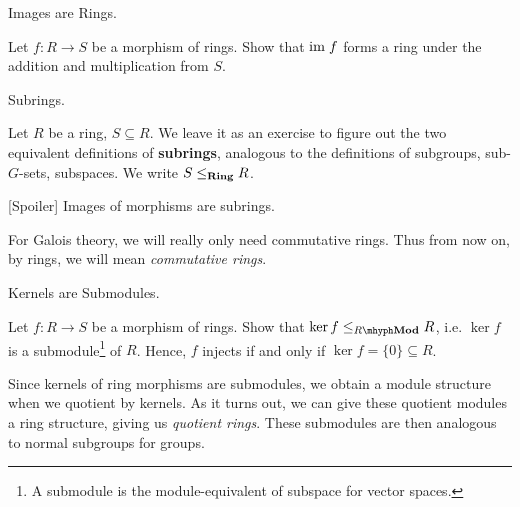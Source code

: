 \documentclass[../../book.tex]{subfiles}
\begin{document}
\begin{ex} [Important] Images are Rings. 

    Let $f : R \to S$ be a morphism of rings. 
    Show that $\textnormal{im}\; f$ forms a ring under the addition and multiplication from $S$. 
\end{ex}

\begin{dfn} Subrings. 

    Let $R$ be a ring, $S \subseteq R$. 
    We leave it as an exercise to figure out the two equivalent definitions
    of \textbf{subrings}, analogous to 
    the definitions of subgroups, sub-$G$-sets, subspaces. 
    We write $S \leq_{\mathbf{Ring}} R$.
    
    [Spoiler] Images of morphisms are subrings. 
\end{dfn}

\begin{rmk}
    For Galois theory, we will really only need commutative rings. 
    Thus from now on, by rings, we will mean \emph{commutative rings}. 
\end{rmk}

\begin{ex} [Important] Kernels are Submodules.

    Let $f : R \to S$ be a morphism of rings. 
    Show that $\ker f \leq_{\RMod} R$, i.e. 
    $\ker f$ is a submodule\footnote{
    A submodule is the module-equivalent of subspace for vector spaces.} of $R$.
    Hence, $f$ injects if and only if $\ker f = \{0\} \subseteq R$.  
\end{ex}

\begin{rmk} 
    
    Since kernels of ring morphisms are submodules, 
    we obtain a module structure when we quotient by kernels.
    As it turns out, we can give these quotient modules a ring structure,
    giving us \emph{quotient rings}.
    These submodules are then analogous to normal subgroups for groups.
    
\end{rmk}
\end{document}
